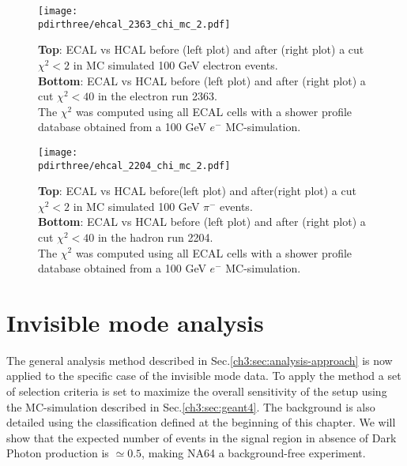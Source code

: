 \begin{figure}[h!]
  \begin{center}
    \texttt{[image: \\pdirthree/ehcal\_2363\_chi\_mc\_2.pdf]}
  \end{center}
  \caption{\textbf{Top}: ECAL vs HCAL before (left plot) and
    after (right plot) a cut
    $\chi^2<2$ in MC simulated 100 GeV electron events. \\
    \textbf{Bottom}: ECAL vs HCAL before (left plot) and after (right
    plot) a cut
    $\chi^2<40$ in the electron run 2363.\\
    The $\chi^2$ was computed using all ECAL cells with a shower
    profile database obtained from a 100 GeV $e^-$ MC-simulation. }
  \label{fig:ehcal_elec}
\end{figure}

\begin{figure}[h!]
  \begin{center}
    \texttt{[image: \\pdirthree/ehcal\_2204\_chi\_mc\_2.pdf]}
  \end{center}
  \caption{\textbf{Top}: ECAL vs HCAL before(left plot) and
    after(right plot) a cut
    $\chi^2<2$ in MC simulated 100 GeV $\pi^-$ events. \\
    \textbf{Bottom}: ECAL vs HCAL before (left plot) and after (right
    plot) a cut
    $\chi^2<40$ in the hadron run 2204.\\
    The $\chi^2$ was computed using all ECAL cells with a shower
    profile database obtained from a 100 GeV $e^-$ MC-simulation. }
  \label{fig:ehcal_hadr}
\end{figure}
\fi

\section{Invisible mode analysis}
\label{ch3:sec:analysis-invis}

The general analysis method described in Sec.\ref{ch3:sec:analysis-approach} is now applied to the specific case of the invisible mode data. To apply the method a set of selection criteria is set to maximize the overall sensitivity of the setup using the MC-simulation described in Sec.\ref{ch3:sec:geant4}. The background is also detailed using the classification defined at the beginning of this chapter. We will show that the expected number of events in the signal region in absence of Dark Photon production is $\simeq 0.5$, making NA64 a background-free experiment.

